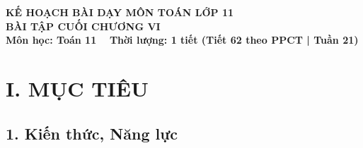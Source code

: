 \documentclass[12pt, a4paper]{article}
\begin{document}
\begin{center}
    {\fontsize{14pt}{17pt}\selectfont \textbf{KẾ HOẠCH BÀI DẠY MÔN TOÁN LỚP 11}}\\[6pt]
    {\fontsize{16pt}{19pt}\selectfont \textbf{BÀI TẬP CUỐI CHƯƠNG VI}}\\[4pt]
    {\fontsize{12pt}{15pt}\selectfont \textbf{Môn học: Toán 11} \ \textbar \ \textbf{Thời lượng: 1 tiết (Tiết 62 theo PPCT | Tuần 21)}}
\end{center}

\vspace{5pt}

\section*{I. MỤC TIÊU}

\subsection*{1. Kiến thức, Năng lực}
\end{document}
